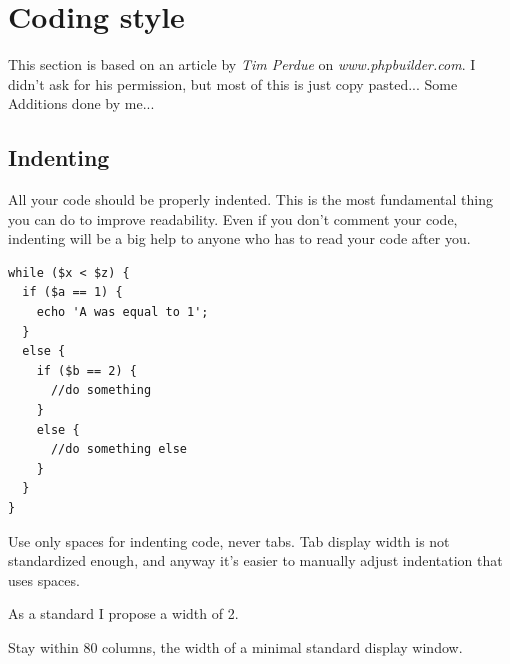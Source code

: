 \documentclass[headexclude,footexclude,12pt,BCOR0pt,DIV15]{scrartcl}
\begin{document}
\thispagestyle{plain}
\tableofcontents

\section{Coding style}
    This section is based on an article by \emph{Tim Perdue} on \emph{www.phpbuilder.com}.
    I didn't ask for his permission, but most of this is just copy pasted... Some Additions done by me...

    \subsection{Indenting}
        All your code should be properly indented. This is the most fundamental thing you can do to
        improve readability. Even if you don't comment your code, indenting will be a big help to anyone
        who has to read your code after you.

        \begin{lstlisting}[stepnumber=0,frame={}]
while ($x < $z) {
  if ($a == 1) {
    echo 'A was equal to 1';
  }
  else {
    if ($b == 2) {
      //do something
    }
    else {
      //do something else
    }
  }
}
        \end{lstlisting}

        Use only spaces for indenting code, never tabs.  Tab display width is not standardized enough,
        and anyway it's easier to manually adjust indentation that uses spaces.

        As a standard I propose a width of 2.

        Stay within 80 columns, the width of a minimal standard display window.
\end{document}
